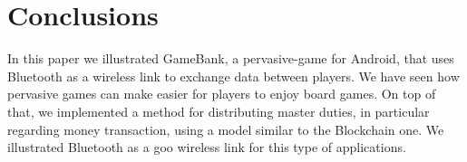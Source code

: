 \section*{Conclusions}

In this paper we illustrated GameBank, a pervasive-game for Android, that uses 
Bluetooth as a wireless link to exchange data between players. We have seen how 
pervasive games can make easier for players to enjoy board games. On top of 
that, we implemented a method for distributing master duties, in particular 
regarding money transaction, using a model similar to the Blockchain one.
We illustrated Bluetooth as a goo wireless link for this type of applications.